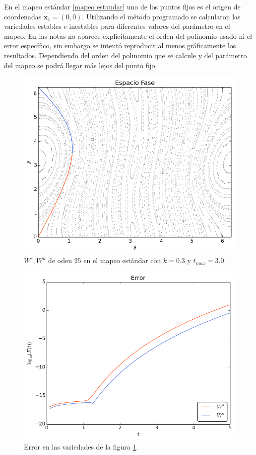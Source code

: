 En el mapeo estándar \eqref{mapeo estandar} uno de los puntos fijos es el origen de coordenadas $\mathbf{x}_{1}=(0,0)$. Utilizando el método programado se calcularon las variedades estables e inestables para diferentes valores del parámetro en el mapeo. En las notas \citep{Mireles} no aparece explícitamente el orden del polinomio usado ni el error específico, sin embargo se intentó reproducir al menos gráficamente los resultados. Dependiendo del orden del polinomio que se calcule y del parámetro del mapeo se podrá llegar más lejos del punto fijo.  
\begin{figure}[H]
 \centering
 \includegraphics[scale=0.6]{estandark03}
 \caption{\footnotesize $W^{s},W^{u}$ de oden $25$ en el mapeo estándar con $k=0.3$ y $t_{max}=3.0$.}
 \label{estandar03}
\end{figure}

\begin{figure}[H]
\centering
\includegraphics[scale=0.6]{error_est_k03} 
\caption{Error en las variedades de la figura \ref{estandar03}.}
\label{error est k03}
\end{figure}


